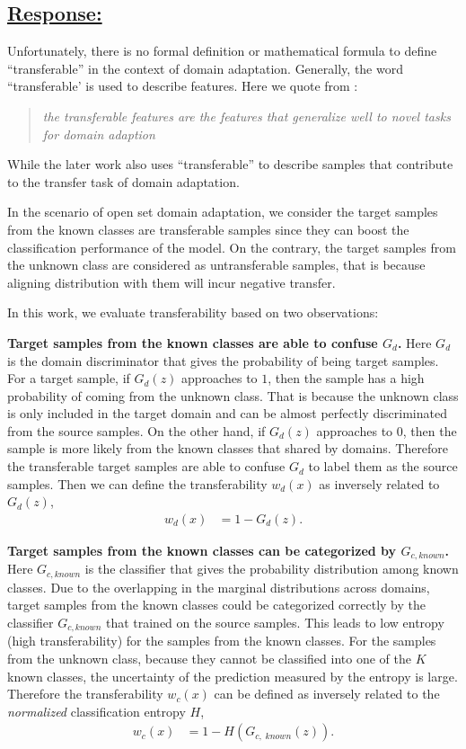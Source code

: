 \subsection*{\underline{\textbf{Response:}}}

Unfortunately, there is no formal definition or mathematical formula to define ``transferable'' in the context of domain adaptation.
Generally, the word ``transferable' is used to describe features.
Here we quote from \cite{DeepAdaptationNetworks}:
\begin{quote}
    \textit{the transferable features are the features that generalize well to novel tasks for domain adaption}
\end{quote}
While the later work \cite{TransferableAttentionDA} also uses ``transferable'' to describe samples that contribute to the transfer task of domain adaptation.

In the scenario of open set domain adaptation, we consider the target samples from the known classes are transferable samples since they can boost the classification performance of the model.
On the contrary, the target samples from the unknown class are considered as untransferable samples, that is because aligning distribution with them will incur negative transfer.

In this work, we evaluate transferability based on two observations:

\textbf{Target samples from the known classes are able to confuse $G_d$.}
Here $G_d$ is the domain discriminator that gives the probability of being target samples.
For a target sample, if $G_d(z)$ approaches to $1$, then the sample has a high probability of coming from the unknown class.
That is because the unknown class is only included in the target domain and can be almost perfectly discriminated from the source samples.
On the other hand, if $G_d(z)$ approaches to $0$, then the sample is more likely from the known classes that shared by domains.
Therefore the transferable target samples are able to confuse $G_d$ to label them as the source samples.
Then we can define the transferability $w_d(x)$ as inversely related to $G_d(z)$,
\begin{align}
    w_d(x) &= 1-G_d(z). \label{eq: domain transferability}
\end{align}

\textbf{Target samples from the known classes can be categorized by $G_{c, known}$.}
Here $G_{c, known}$ is the classifier that gives the probability distribution among known classes.
Due to the overlapping in the marginal distributions across domains, target samples from the known classes could be categorized correctly by the classifier $G_{c, known}$ that trained on the source samples. 
This leads to low entropy (high transferability) for the samples from the known classes.
For the samples from the unknown class, because they cannot be classified into one of the $K$ known classes, the uncertainty of the prediction measured by the entropy is large.
Therefore the transferability $w_c(x)$ can be defined as inversely related to the \textit{normalized} classification entropy $H$,
\begin{align}
    w_c(x) &=1-H(G_{c,\; known}(z)). \label{eq: class transferability}
\end{align}

